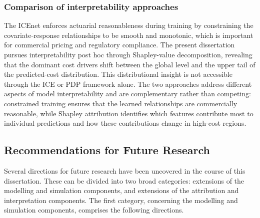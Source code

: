 \subsubsection{Comparison of interpretability approaches}
The ICEnet enforces actuarial reasonableness during training by
constraining the covariate-response relationships to be smooth and
monotonic, which is important for commercial pricing and regulatory
compliance.  The present dissertation pursues interpretability post hoc
through Shapley-value decomposition, revealing that the dominant cost
drivers shift between the global level and the upper tail of the
predicted-cost distribution.  This distributional insight is not
accessible through the ICE or PDP framework alone.  The two approaches
address different aspects of model interpretability and are
complementary rather than competing: constrained training ensures that
the learned relationships are commercially reasonable, while
Shapley attribution identifies which features contribute most to
individual predictions and how these contributions change in high-cost
regions.


\subsection{Recommendations for Future Research}
\label{sec:future_research}

Several directions for future research have been uncovered in the course
of this dissertation.  These can be divided into two broad categories:
extensions of the modelling and simulation components, and extensions of
the attribution and interpretation components.  The first category,
concerning the modelling and simulation components, comprises the
following directions.

